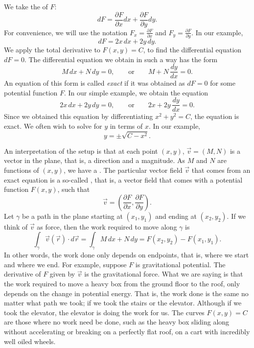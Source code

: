 We take the
\emph{} of
$F$:
\begin{equation*}
dF = \frac{\partial F}{\partial x} dx + \frac{\partial F}{\partial y} dy .
\end{equation*}
For convenience,
we will use the notation
$F_x = \frac{\partial F}{\partial x}$ and
$F_y = \frac{\partial F}{\partial y}$.
In our example,
\begin{equation*}
dF = 2x \, dx + 2y \, dy .
\end{equation*}
We apply the total derivative to $F(x,y) = C$, to find
the differential equation $dF = 0$.  The differential equation we obtain in such a way
has the form
\begin{equation*}
M \, dx + N \, dy = 0, \qquad
\text{or} \qquad
M + N \, \frac{dy}{dx} = 0 .
\end{equation*}
An equation of this form
is called \emph{exact} if it was obtained as $dF = 0$ for some potential
function $F$.
In our simple example, we obtain the equation
\begin{equation*}
2x \, dx + 2y \, dy = 0, \qquad
\text{or} \qquad
2x + 2y \, \frac{dy}{dx} = 0 .
\end{equation*}
Since we obtained this equation by differentiating $x^2+y^2=C$, 
the equation is exact.
We often wish to solve for $y$ in terms of $x$.  In our example,
\begin{equation*}
y = \pm \sqrt{C-x^2} .
\end{equation*}

An interpretation of the setup is that at each point $(x,y)$, $\vec{v} = (M,N)$ is
a vector in the plane, that is, a direction and a magnitude.
As $M$ and $N$ are functions of $(x,y)$, we have a \emph{}.  The particular 
vector field $\vec{v}$ that comes from an exact equation is a so-called
\emph{}, that is, a vector field that comes with a
potential function $F(x,y)$, such that
\begin{equation*}
\vec{v} = \left( \frac{\partial F}{\partial x} ,\frac{\partial F}{\partial
y} \right) .
\end{equation*}
Let
$\gamma$ be a path in the plane starting at $(x_1,y_1)$ and ending at
$(x_2,y_2)$.
If we think of $\vec{v}$ as force, then the work required to
move along $\gamma$ is
\begin{equation*}
\int_\gamma \vec{v}(\vec{r}) \cdot d\vec{r}
=
\int_\gamma M \, dx + N \, dy
=
F(x_2,y_2) - F(x_1,y_1) .
\end{equation*}
In other words, the work done only depends on endpoints, that is, where we start and
where we end.   For example, suppose $F$ is gravitational potential.  The
derivative of $F$ given by $\vec{v}$ is the gravitational force.
What we
are saying is that the work required to move a heavy box from the ground
floor to the roof, only depends on the change in potential energy.  That is,
the work done is the same
no matter what path we took; if we took the stairs or the elevator.
Although if we took the elevator, the elevator is doing the work for us.
The curves $F(x,y) = C$ are those where no work need be done, such as
the heavy box sliding along without accelerating or breaking on a perfectly
flat roof, on a cart with incredibly well oiled wheels.

